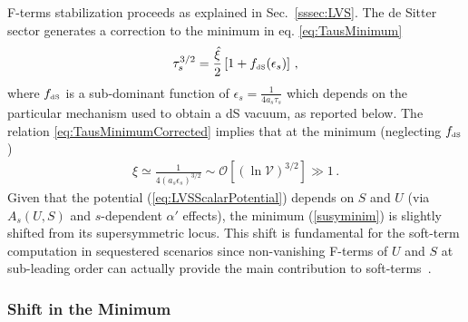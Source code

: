 \documentclass[12pt,a4paper]{book}
\def\dS{{\scriptscriptstyle \rm dS}}
\newcommand{\mc}{\mathcal}
\begin{document}
F-terms stabilization proceeds as explained in Sec.~\ref{sssec:LVS}. The de Sitter sector generates a correction to the minimum in eq. \eqref{eq:TausMinimum}
\begin{align}
\tau_s^{3/2} = \frac{\hat\xi}{2} \left[1 + f_\dS(\epsilon_s) \right]\,,
\label{eq:TausMinimumCorrected}
\end{align}
where $f_\dS$ is a sub-dominant function of $\epsilon_s = \frac{1}{4 a_s \tau_s}$ which depends on the particular mechanism used to obtain a dS vacuum, as reported below. The relation \eqref{eq:TausMinimumCorrected} implies that at the minimum (neglecting $f_\dS$)
\begin{align}
\hat\xi\simeq \frac{1}{4\left(a_s \epsilon_s\right)^{3/2}}\sim\mc{O}\left[\left(\ln\mathcal{V}\right)^{3/2}\right] \gg 1\,.
\label{tausms2}
\end{align}
Given that the potential (\ref{eq:LVSScalarPotential}) depends on $S$ and $U$ (via $A_s(U,S)$ and $s$-dependent $\alpha'$ effects), the minimum (\ref{susyminim}) is slightly shifted from its supersymmetric locus. This shift is fundamental for the soft-term computation in sequestered scenarios since non-vanishing F-terms of $U$ and $S$ at sub-leading order can actually provide the main contribution to soft-terms~\cite{Blumenhagen:2009gk}.

\subsubsection{Shift in the Minimum}
\label{shiftsection}
\end{document}

